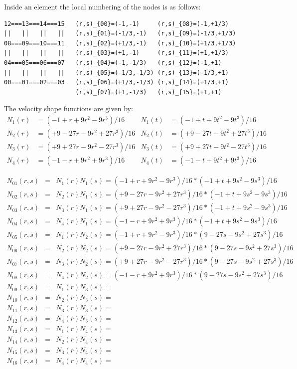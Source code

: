 Inside an element the local numbering of the nodes is as follows:
\begin{verbatim}
12===13===14===15   (r,s)_{00}=(-1,-1)     (r,s)_{08}=(-1,+1/3)  
||   ||   ||   ||   (r,s)_{01}=(-1/3,-1)   (r,s)_{09}=(-1/3,+1/3)
08===09===10===11   (r,s)_{02}=(+1/3,-1)   (r,s)_{10}=(+1/3,+1/3)
||   ||   ||   ||   (r,s)_{03}=(+1,-1)     (r,s)_{11}=(+1,+1/3)
04===05===06===07   (r,s)_{04}=(-1,-1/3)   (r,s)_{12}=(-1,+1)
||   ||   ||   ||   (r,s)_{05}=(-1/3,-1/3) (r,s)_{13}=(-1/3,+1)
00===01===02===03   (r,s)_{06}=(+1/3,-1/3) (r,s)_{14}=(+1/3,+1)
                    (r,s)_{07}=(+1,-1/3)   (r,s)_{15}=(+1,+1)
\end{verbatim}

The velocity shape functions are given by:
\begin{align}
N_1(r)&=(-1   +r +9r^2 - 9r^3)/16 & 
N_1(t)&=(-1   +t +9t^2 - 9t^3)/16 \nonumber\\
N_2(r)&=(+9 -27r -9r^2 +27r^3)/16 &
N_2(t)&=(+9 -27t -9t^2 +27t^3)/16 \nonumber\\
N_3(r)&=(+9 +27r -9r^2 -27r^3)/16 &
N_3(t)&=(+9 +27t -9t^2 -27t^3)/16 \nonumber\\
N_4(r)&=(-1   -r +9r^2 + 9r^3)/16 &
N_4(t)&=(-1   -t +9t^2 + 9t^3)/16 \nonumber
\end{align}


\begin{mdframed}[backgroundcolor=blue!5]
\begin{eqnarray}
N_{01}(r,s)&=&N_1(r)N_1(s) = (-1   +r +9r^2 - 9r^3)/16 * (-1  +t +9s^2 - 9s^3)/16 \nonumber\\
N_{02}(r,s)&=&N_2(r)N_1(s) = (+9 -27r -9r^2 +27r^3)/16 * (-1  +t +9s^2 - 9s^3)/16 \nonumber\\
N_{03}(r,s)&=&N_3(r)N_1(s) = (+9 +27r -9r^2 -27r^3)/16 * (-1  +t +9s^2 - 9s^3)/16 \nonumber\\
N_{04}(r,s)&=&N_4(r)N_1(s) = (-1   -r +9r^2 + 9r^3)/16 * (-1  +t +9s^2 - 9s^3)/16 \nonumber\\
N_{05}(r,s)&=&N_1(r)N_2(s) = (-1   +r +9r^2 - 9r^3)/16 * (9 -27s -9s^2 +27s^3)/16 \nonumber\\
N_{06}(r,s)&=&N_2(r)N_2(s) = (+9 -27r -9r^2 +27r^3)/16 * (9 -27s -9s^2 +27s^3)/16 \nonumber\\
N_{07}(r,s)&=&N_3(r)N_2(s) = (+9 +27r -9r^2 -27r^3)/16 * (9 -27s -9s^2 +27s^3)/16 \nonumber\\
N_{08}(r,s)&=&N_4(r)N_2(s) = (-1   -r +9r^2 + 9r^3)/16 * (9 -27s -9s^2 +27s^3)/16 \nonumber\\
N_{09}(r,s)&=&N_1(r)N_3(s) =\\
N_{10}(r,s)&=&N_2(r)N_3(s) =\\
N_{11}(r,s)&=&N_3(r)N_3(s) =\\
N_{12}(r,s)&=&N_4(r)N_3(s) =\\
N_{13}(r,s)&=&N_1(r)N_4(s) =\\
N_{14}(r,s)&=&N_2(r)N_4(s) =\\
N_{15}(r,s)&=&N_3(r)N_4(s) =\\
N_{16}(r,s)&=&N_4(r)N_4(s) =
\end{eqnarray}
\end{mdframed}

